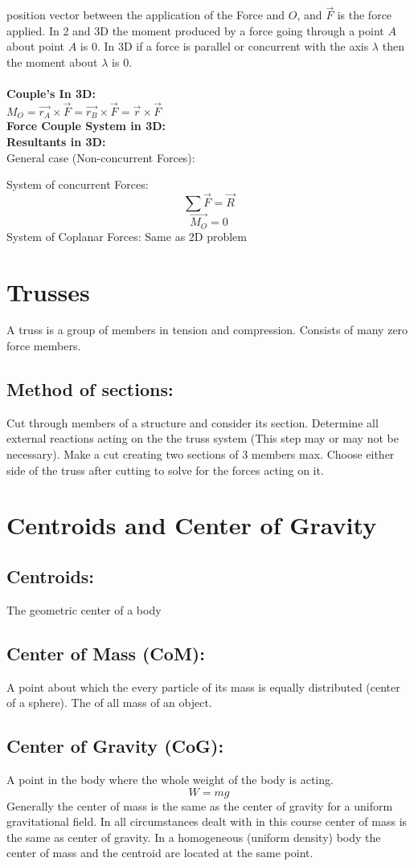 \documentclass[14pt]{article}
\begin{document}
    position vector between the application of the Force and $O$, and
    $\vec{F}$ is the force applied. In 2 and 3D the moment produced by a
    force going through a point $A$ about point $A$ is $0$. In 3D if a
    force is parallel or concurrent with the axis $\lambda$ then the
    moment about $\lambda$ is $0$.\\\\
    \textbf{Couple's In 3D:}\\
    $M_O=\vec{r_A}\times\vec{F}=\vec{r_B}\times\vec{F}=\vec{r}\times\vec{F}$\\
    \textbf{Force Couple System in 3D:}\\
    \textbf{Resultants in 3D:}\\
    General case (Non-concurrent Forces): 
    
    System of concurrent Forces:
    $$\sum\vec{F}=\vec{R}$$$$\vec{M_O}=0$$ System of Coplanar Forces:
    Same as 2D problem
    \section{Trusses}
    A truss is a group of members in tension and compression. Consists
    of many zero force members.
    \subsection{Method of sections:}
    Cut through members of a structure and consider its section.
    Determine all external reactions acting on the the truss system
    (This step may or may not be necessary). Make a cut creating two
    sections of 3 members max. Choose either side of the truss after
    cutting to solve for the forces acting on it.

    \section{Centroids and Center of Gravity}
    \subsection{Centroids:} The geometric center of a body
    \subsection{Center of Mass (CoM):} A point about which the every
    particle of its mass is equally distributed (center of a sphere).
    The  of all mass of an object. \subsection{Center of Gravity (CoG):}
    A point in the body where the whole weight of the body is acting.
    $$W=m g$$ Generally the center of mass is the same as the center of
    gravity for a uniform gravitational field. In all circumstances
    dealt with in this course center of mass is the same as center of
    gravity. In a homogeneous (uniform density) body the center of mass
    and the centroid are located at the same point. 
\end{document}
